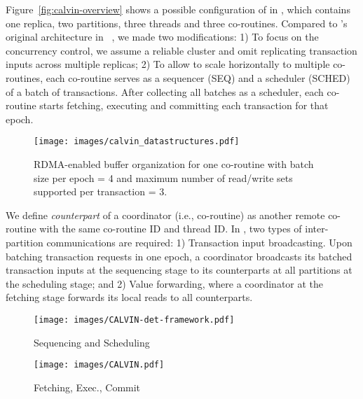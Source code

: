 Figure~\ref{fig:calvin-overview} shows a possible configuration of \calvin in \projectname, which contains one replica, two partitions, three threads and three co-routines. Compared to
\calvin's original architecture in ~\cite{Thomson:2012:CFD:2213836.2213838}, 
we made two modifications:
1) To focus on the concurrency control, 
we assume a reliable cluster and 
omit replicating transaction inputs across multiple replicas;
2) To allow \calvin to scale horizontally to multiple co-routines, each co-routine serves as a sequencer (SEQ) and a scheduler (SCHED) of a batch of transactions. After collecting all batches as a scheduler, each co-routine starts fetching, executing and committing each transaction for that epoch.

\setlength{\intextsep}{2pt}%
\setlength{\columnsep}{8pt}%
\begin{wrapfigure}[11]{r}{.50\linewidth}
    \centering
    \vspace{-0.2cm}
    \texttt{[image: images/calvin\_datastructures.pdf]}
    \vspace{-0.8cm}
    \caption{RDMA-enabled buffer organization for one \calvin co-routine
    with batch size per epoch = 4 and maximum number of read/write sets supported per transaction = 3.}
    \vspace{-0.2cm}
    \label{fig:calvin-buffers}
\end{wrapfigure}
We define \emph{counterpart} of a coordinator 
(i.e., co-routine) as another remote co-routine with the same co-routine ID and thread ID. In \calvin, two types of inter-partition communications are required:
1) Transaction input broadcasting. Upon batching transaction requests in one epoch, a coordinator broadcasts its batched transaction inputs at the sequencing stage to its counterparts at all partitions at the scheduling stage; and 2) Value forwarding, where a coordinator at the fetching stage forwards its local reads to all counterparts. 



\begin{figure}[t]
    \begin{minipage}{.49\linewidth}
    \centering
    \texttt{[image: images/CALVIN-det-framework.pdf]}
    \vspace{-10mm}
    \caption{Sequencing and Scheduling}
    \label{fig:calvin-det-framework}
    \end{minipage}
    \begin{minipage}{.49\linewidth}
    \centering
    \texttt{[image: images/CALVIN.pdf]}
    \vspace{-10mm}
    \caption{Fetching, Exec., Commit}
    \label{fig:calvin-transaction}
    \end{minipage}
    \vspace{-7mm}
\end{figure}

